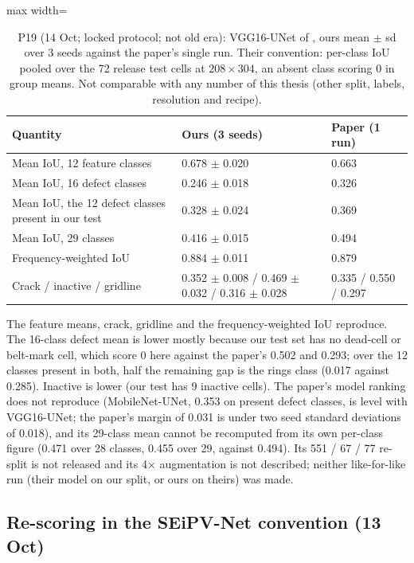 \begin{table}[htbp]
\centering
\footnotesize
\caption{P19 (14 Oct; locked protocol; not old era): VGG16-UNet of \citet{hanifi2025multiclass}, ours mean $\pm$ sd over 3 seeds
against the paper's single run. Their convention: per-class IoU pooled over the 72 release test cells at $208 \times 304$, an absent
class scoring 0 in group means. Not comparable with any number of this thesis (other split, labels, resolution and recipe).}
\label{tab:repro-p19}
\begin{adjustbox}{max width=\linewidth}
\begin{tabular}{@{}lll@{}}
\toprule
Quantity & Ours (3 seeds) & Paper (1 run) \\
\midrule
Mean IoU, 12 feature classes & 0.678 $\pm$ 0.020 & 0.663 \\
Mean IoU, 16 defect classes & 0.246 $\pm$ 0.018 & 0.326 \\
Mean IoU, the 12 defect classes present in our test & 0.328 $\pm$ 0.024 & 0.369 \\
Mean IoU, 29 classes & 0.416 $\pm$ 0.015 & 0.494 \\
Frequency-weighted IoU & 0.884 $\pm$ 0.011 & 0.879 \\
Crack / inactive / gridline & 0.352 $\pm$ 0.008 / 0.469 $\pm$ 0.032 / 0.316 $\pm$ 0.028 & 0.335 / 0.550 / 0.297 \\
\bottomrule
\end{tabular}
\end{adjustbox}
\end{table}

The feature means, crack, gridline and the frequency-weighted IoU reproduce. The 16-class defect mean is lower mostly because our test
set has no dead-cell or belt-mark cell, which score 0 here against the paper's 0.502 and 0.293; over the 12 classes present in both,
half the remaining gap is the rings class (0.017 against 0.285). Inactive is lower (our test has 9 inactive cells). The paper's model
ranking does not reproduce (MobileNet-UNet, 0.353 on present defect classes, is level with VGG16-UNet; the paper's margin of 0.031 is
under two seed standard deviations of 0.018), and its 29-class mean cannot be recomputed from its own per-class figure (0.471 over 28
classes, 0.455 over 29, against 0.494). Its 551 / 67 / 77 re-split is not released and its 4$\times$ augmentation is not described;
neither like-for-like run (their model on our split, or ours on theirs) was made.

\subsection{Re-scoring in the SEiPV-Net convention (13 Oct)}\label{sec:repro-seipv}


